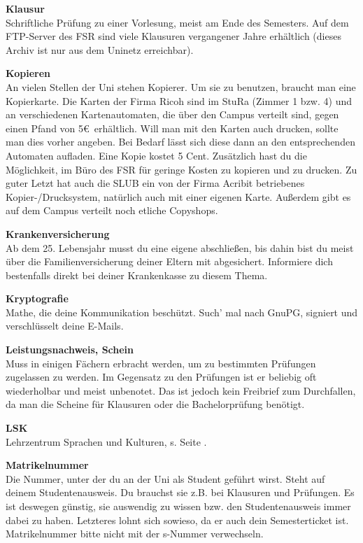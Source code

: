 \textbf{Klausur} \\
Schriftliche Prüfung zu einer Vorlesung, meist am Ende des Semesters.
Auf dem FTP-Server des FSR  sind viele Klausuren vergangener Jahre erhältlich (dieses Archiv ist nur aus dem Uninetz erreichbar).

\textbf{Kopieren} \\
An vielen Stellen der Uni stehen Kopierer.
Um sie zu benutzen, braucht man eine Kopierkarte.
Die Karten der Firma Ricoh sind im StuRa (Zimmer 1 bzw. 4) und an verschiedenen Kartenautomaten, die über den Campus verteilt sind, gegen einen Pfand von 5\euro\ erhältlich.
Will man mit den Karten auch drucken, sollte man dies vorher angeben.
Bei Bedarf lässt sich diese dann an den entsprechenden Automaten aufladen.
Eine Kopie kostet 5 Cent.
Zusätzlich hast du die Möglichkeit, im Büro des FSR für geringe Kosten zu kopieren und zu drucken.
Zu guter Letzt hat auch die SLUB ein von der Firma Acribit betriebenes Kopier-/Drucksystem, natürlich auch mit einer eigenen Karte.
Außerdem gibt es auf dem Campus verteilt noch etliche Copyshops.

\textbf{Krankenversicherung} \\
Ab dem 25. Lebensjahr musst du eine eigene abschließen, bis dahin bist du meist über die Familienversicherung deiner Eltern mit abgesichert.
Informiere dich bestenfalls direkt bei deiner Krankenkasse zu diesem Thema.

\textbf{Kryptografie} \\
Mathe, die deine Kommunikation beschützt.
Such' mal nach GnuPG, signiert und verschlüsselt deine E-Mails.

\textbf{Leistungsnachweis, Schein} \\
Muss in einigen Fächern erbracht werden, um zu bestimmten Prüfungen zugelassen zu werden.
Im Gegensatz zu den Prüfungen ist er beliebig oft wiederholbar und meist unbenotet.
Das ist jedoch kein Freibrief zum Durchfallen, da man die Scheine für Klausuren oder die Bachelorprüfung benötigt.

\textbf{LSK} \\
Lehrzentrum Sprachen und Kulturen, s. Seite \pageref{sec:sprachausbildung}.

\textbf{Matrikelnummer} \\
Die Nummer, unter der du an der Uni als Student geführt wirst.
Steht auf deinem Studentenausweis.
Du brauchst sie z.B. bei Klausuren und Prüfungen.
Es ist deswegen günstig, sie auswendig zu wissen bzw. den Studentenausweis immer dabei zu haben.
Letzteres lohnt sich sowieso, da er auch dein Semesterticket ist.
Matrikelnummer bitte nicht mit der s-Nummer verwechseln.

